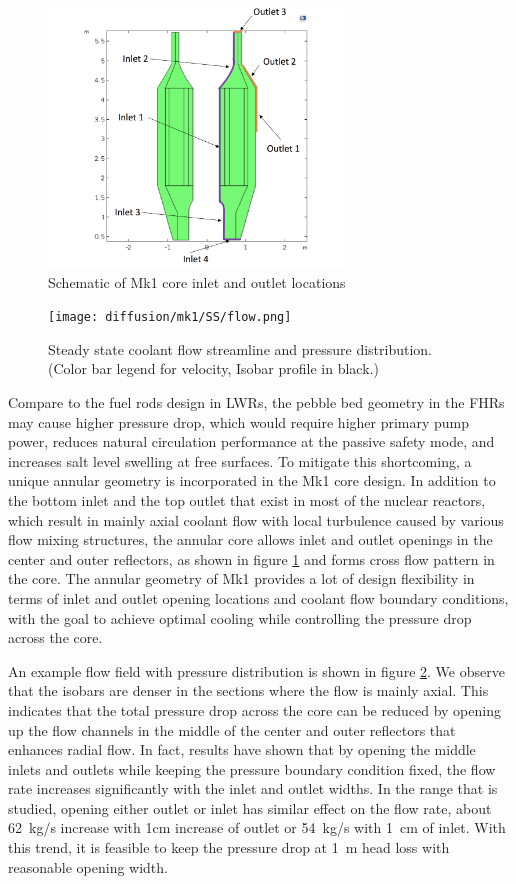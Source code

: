 \documentclass{elsarticle}
\begin{document}
\begin{figure}[h]
    \centering
    \includegraphics[width=0.7\textwidth]{images/diffusion/mk1/inlet_outlet.png}
    \caption{Schematic of Mk1 core inlet and outlet locations}
    \label{fig:inlet_outlet}
\end{figure}


\begin{figure}[h]
\centering
  \texttt{[image: diffusion/mk1/SS/flow.png]}
  \caption{Steady state coolant flow streamline and pressure distribution. (Color bar legend for velocity, Isobar profile in black.)}
  \label{fig:mk1_flow}
\end{figure}

Compare to the fuel rods design in LWRs, the pebble bed geometry in the FHRs may cause higher pressure drop, which would require higher primary pump power, reduces natural circulation performance at the passive safety mode, and increases salt level swelling at free surfaces. To mitigate this shortcoming, a unique annular geometry is incorporated in the Mk1 core design. 
In addition to the bottom inlet and the top outlet that exist in most of the nuclear reactors, which result in mainly axial coolant flow with local turbulence caused by various flow mixing structures, the annular core allows inlet and outlet openings in the center and outer reflectors, as shown in figure \ref{fig:inlet_outlet} and forms cross flow pattern in the core.
The annular geometry of Mk1 provides a lot of design flexibility in terms of inlet and outlet opening locations and coolant flow boundary conditions, with the goal to achieve optimal cooling while controlling the pressure drop across the core. 


An example flow field with pressure distribution is shown in figure \ref{fig:mk1_flow}. We observe that the isobars are denser in the sections where the flow is mainly axial. This indicates that the total pressure drop across the core can be reduced by opening up the flow channels in the middle of the center and outer reflectors that enhances radial flow.
In fact, results have shown that by opening the middle inlets and outlets while keeping the pressure boundary condition fixed, the flow rate increases significantly with the inlet and outlet widths. In the range that is studied, opening either outlet or inlet has similar effect on the flow rate, about 62~kg/s increase with 1cm increase of outlet or 54~kg/s with 1~cm of inlet. With this trend, it is feasible to keep the pressure drop at 1~m head loss with reasonable opening width. 
\end{document}
